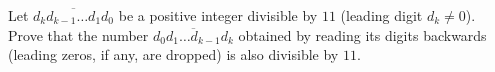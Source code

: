 Let $\overline{d_kd_{k-1}\ldots d_1d_0}$ be a positive integer divisible by $11$ (leading digit $d_k\ne0$). Prove that the number $\overline{d_0d_1\ldots d_{k-1}d_k}$ obtained by reading its digits backwards (leading zeros, if any, are dropped) is also divisible by $11$.
